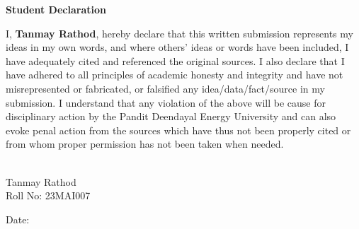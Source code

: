 \begin{center}
	\textbf{\large Student Declaration}
\end{center}

I, \textcolor{internationalkleinblue}{\textbf{Tanmay Rathod}}, hereby declare that this written submission represents my ideas in my own words, and where others’ ideas or words have been included, I have adequately cited and referenced the original sources. I also declare that I have adhered to all principles of academic honesty and integrity and have not misrepresented or fabricated, or falsified any idea/data/fact/source in my submission. I understand that any violation of the above will be cause for disciplinary action by the Pandit Deendayal Energy University and can also evoke penal action from the sources which have thus not been properly cited or from whom proper permission has not been taken when needed.
\vspace{0.8cm}
\vspace{0.8cm}
\begin{flushright}
    \makebox[1.8in]{\hrulefill}\\
    Tanmay Rathod\\
    Roll No: 23MAI007\\
\end{flushright}
\vfill
\begin{flushleft}
	Date: \makebox[1.8in]{\hrulefill}
\end{flushleft} 